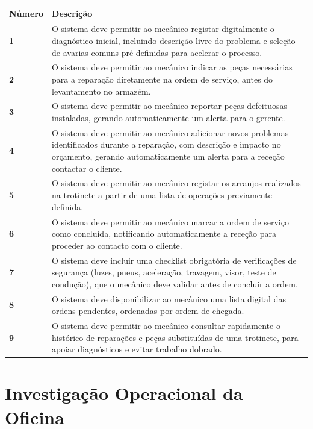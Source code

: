 \documentclass[11pt,a4paper]{article}
\begin{document}
	\begin{tabularx}{\textwidth}{@{}|l|X|@{}}
		\hline
		\rowcolor{gray!10} \textbf{Número} & \textbf{Descrição} \\ \hline
		\textbf{1} & O sistema deve permitir ao mecânico registar digitalmente o diagnóstico inicial, incluindo descrição livre do problema e seleção de avarias comuns pré‑definidas para acelerar o processo. \\ \hline
		\textbf{2} & O sistema deve permitir ao mecânico indicar as peças necessárias para a reparação diretamente na ordem de serviço, antes do levantamento no armazém. \\ \hline	
		\textbf{3} & O sistema deve permitir ao mecânico reportar peças defeituosas instaladas, gerando automaticamente um alerta para o gerente. \\ \hline
		\textbf{4} & O sistema deve permitir ao mecânico adicionar novos problemas identificados durante a reparação, com descrição e impacto no orçamento, gerando automaticamente um alerta para a receção contactar o cliente. \\ \hline
		\textbf{5} & O sistema deve permitir ao mecânico registar os arranjos realizados na trotinete a partir de uma lista de operações previamente definida. \\ \hline
		\textbf{6} & O sistema deve permitir ao mecânico marcar a ordem de serviço como concluída, notificando automaticamente a receção para proceder ao contacto com o cliente. \\ \hline
		\textbf{7} & O sistema deve incluir uma checklist obrigatória de verificações de segurança (luzes, pneus, aceleração, travagem, visor, teste de condução), que o mecânico deve validar antes de concluir a ordem. \\ \hline
		\textbf{8} & O sistema deve disponibilizar ao mecânico uma lista digital das ordens pendentes, ordenadas por ordem de chegada. \\ \hline
		\textbf{9} & O sistema deve permitir ao mecânico consultar rapidamente o histórico de reparações e peças substituídas de uma trotinete, para apoiar diagnósticos e evitar trabalho dobrado. \\ \hline
	\end{tabularx}
	
	\vspace{1cm}
	
	\section*{Investigação Operacional da Oficina}
	
\end{document}

